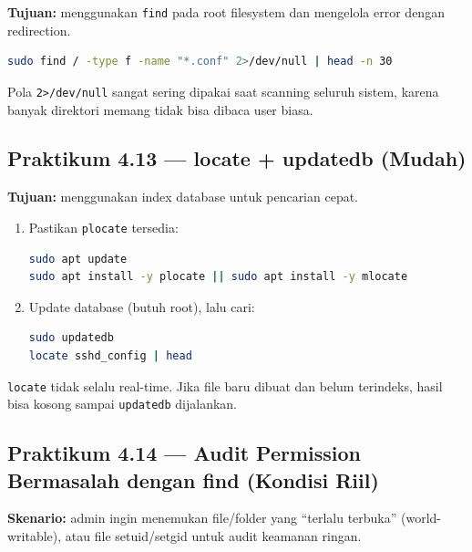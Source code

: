 \textbf{Tujuan:} menggunakan \texttt{find} pada root filesystem dan mengelola error dengan redirection.

\begin{lstlisting}[language=bash, caption={Scan *.conf tanpa membanjiri error permission}]
sudo find / -type f -name "*.conf" 2>/dev/null | head -n 30
\end{lstlisting}

\begin{tipbox}
Pola \texttt{2>/dev/null} sangat sering dipakai saat scanning seluruh sistem,
karena banyak direktori memang tidak bisa dibaca user biasa.
\end{tipbox}

\subsection*{Praktikum 4.13 --- locate + updatedb (Mudah)}
\textbf{Tujuan:} menggunakan index database untuk pencarian cepat.

\begin{enumerate}
    \item Pastikan \texttt{plocate} tersedia:
\begin{lstlisting}[language=bash, caption={Memasang locate tool}]
sudo apt update
sudo apt install -y plocate || sudo apt install -y mlocate
\end{lstlisting}

    \item Update database (butuh root), lalu cari:
\begin{lstlisting}[language=bash, caption={Update database locate dan melakukan pencarian}]
sudo updatedb
locate sshd_config | head
\end{lstlisting}
\end{enumerate}

\begin{warningbox}
\texttt{locate} tidak selalu real-time. Jika file baru dibuat dan belum terindeks,
hasil bisa kosong sampai \texttt{updatedb} dijalankan.
\end{warningbox}

\subsection*{Praktikum 4.14 --- Audit Permission Bermasalah dengan find (Kondisi Riil)}
\textbf{Skenario:} admin ingin menemukan file/folder yang ``terlalu terbuka'' (world-writable),
atau file setuid/setgid untuk audit keamanan ringan.

